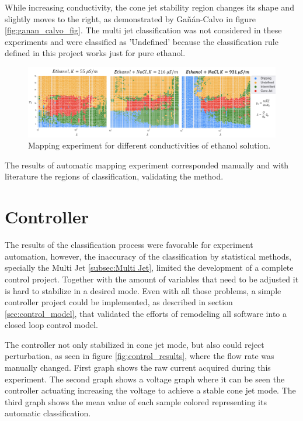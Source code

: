         While increasing conductivity, the cone jet stability region changes its shape and slightly moves to the right, as demonstrated by Gañán-Calvo in figure \ref{fig:ganan_calvo_fig}.
        The multi jet classification was not considered in these experiments and were classified as 'Undefined' because the classification rule defined in this project works just for pure ethanol.

        \begin{figure}[H]
            \center
            \includegraphics[width=18cm]{Figuras/may/conductivity_test.png}
            \caption{Mapping experiment for different conductivities of ethanol solution.}
            \label{fig:conductivity_test}
        \end{figure}


    The results of automatic mapping experiment corresponded manually and with literature the regions of classification, validating the method.


\section{Controller}
\label{sec:controller_results}

    The results of the classification process were favorable for experiment automation, however, the inaccuracy of the classification by statistical methods, specially the Multi Jet \ref{subsec:Multi Jet}, limited the development of a complete control project.
    Together with the amount of variables that need to be adjusted it is hard to stabilize in a desired mode.
    Even with all those problems, a simple controller project could be implemented, as described in section \ref{sec:control_model}, that validated the efforts of remodeling all software into a closed loop control model.
    
    The controller not only stabilized in cone jet mode, but also could reject perturbation, as seen in figure \ref{fig:control_results}, where the flow rate was manually changed.
    First graph shows the raw current acquired during this experiment.
    The second graph shows a voltage graph where it can be seen the controller actuating increasing the voltage to achieve a stable cone jet mode.
    The third graph shows the mean value of each sample colored representing its automatic classification.
    
